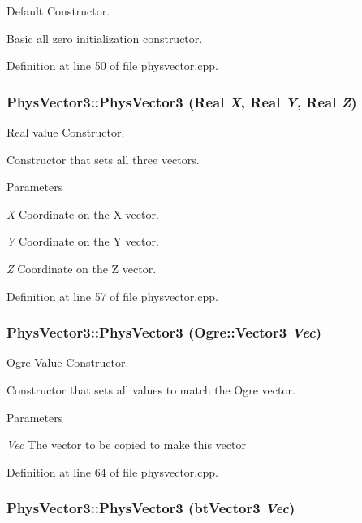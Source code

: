 Default Constructor. 

Basic all zero initialization constructor. 

Definition at line 50 of file physvector.cpp.

\hypertarget{classPhysVector3_a0fd6687cacb095a14a398fd88a33d76a}{
\subsubsection[{PhysVector3}]{\setlength{\rightskip}{0pt plus 5cm}PhysVector3::PhysVector3 (Real {\em X}, \/  Real {\em Y}, \/  Real {\em Z})}}
\label{da/d11/classPhysVector3_a0fd6687cacb095a14a398fd88a33d76a}


Real value Constructor. 

Constructor that sets all three vectors. 
\begin{DoxyParams}{Parameters}
\item[{\em X}]Coordinate on the X vector. \item[{\em Y}]Coordinate on the Y vector. \item[{\em Z}]Coordinate on the Z vector. \end{DoxyParams}


Definition at line 57 of file physvector.cpp.

\hypertarget{classPhysVector3_a6a039f4d76279874f44b0c8b52a2ac48}{
\subsubsection[{PhysVector3}]{\setlength{\rightskip}{0pt plus 5cm}PhysVector3::PhysVector3 (Ogre::Vector3 {\em Vec})}}
\label{da/d11/classPhysVector3_a6a039f4d76279874f44b0c8b52a2ac48}


Ogre Value Constructor. 

Constructor that sets all values to match the Ogre vector. 
\begin{DoxyParams}{Parameters}
\item[{\em Vec}]The vector to be copied to make this vector \end{DoxyParams}


Definition at line 64 of file physvector.cpp.

\hypertarget{classPhysVector3_a09399e22695bed8c4742e9b62c4e7525}{
\subsubsection[{PhysVector3}]{\setlength{\rightskip}{0pt plus 5cm}PhysVector3::PhysVector3 (btVector3 {\em Vec})}}
\label{da/d11/classPhysVector3_a09399e22695bed8c4742e9b62c4e7525}



